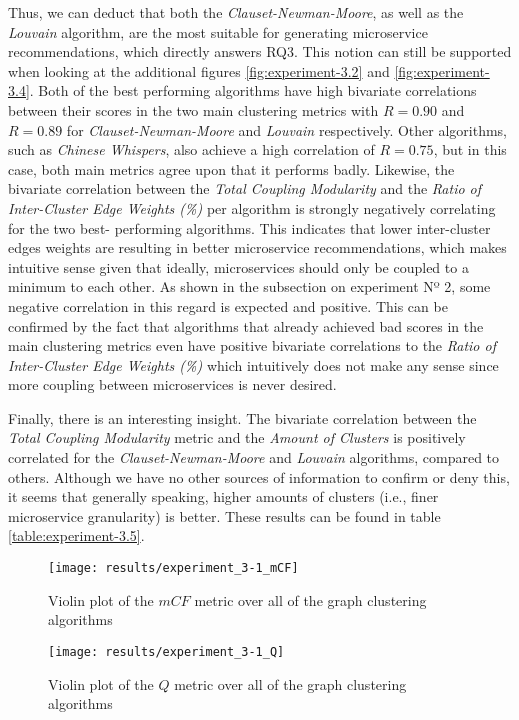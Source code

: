 \documentclass[12pt,a4paper]{report}
\begin{document}
Thus, we can deduct that both the \textit{Clauset-Newman-Moore}, as well as the
\textit{Louvain} algorithm, are the most suitable for generating microservice
recommendations, which directly answers RQ3. This notion can still be supported
when looking at the additional figures \ref{fig:experiment-3.2} and
\ref{fig:experiment-3.4}. Both of the best performing algorithms have high bivariate
correlations between their scores in the two main clustering metrics with \(R =
0.90\) and \(R = 0.89\) for \textit{Clauset-Newman-Moore} and \textit{Louvain}
respectively. Other algorithms, such as \textit{Chinese Whispers}, also achieve
a high correlation of \(R = 0.75\), but in this case, both main metrics agree
upon that it performs badly. Likewise, the bivariate correlation between the
\textit{Total Coupling Modularity} and the \textit{Ratio of Inter-Cluster Edge Weights (\%)}
per algorithm is strongly negatively correlating for the two best\hyp
performing algorithms. This indicates that lower inter-cluster edges weights
are resulting in better microservice recommendations, which makes intuitive
sense given that ideally, microservices should only be coupled to a minimum to
each other. As shown in the subsection on experiment Nº 2, some negative
correlation in this regard is expected and positive. This can be confirmed by
the fact that algorithms that already achieved bad scores in the main
clustering metrics even have positive bivariate correlations to the \textit{
Ratio of Inter-Cluster Edge Weights (\%)} which intuitively does not make any
sense since more coupling between microservices is never desired.

Finally, there is an interesting insight. The bivariate correlation between the
\textit{Total Coupling Modularity} metric and the \textit{Amount of Clusters}
is positively correlated for the \textit{Clauset-Newman-Moore} and \textit{
Louvain} algorithms, compared to others. Although we have no other sources of
information to confirm or deny this, it seems that generally speaking, higher
amounts of clusters (i.e., finer microservice granularity) is better. These
results can be found in table \ref{table:experiment-3.5}.

\begin{figure}[htbp]
\centering
\texttt{[image: results/experiment\_3-1\_mCF]}
\caption{Violin plot of the $mCF$ metric over all of the graph clustering algorithms}
\label{fig:experiment-3.1_mCF}
\end{figure}

\begin{figure}[htbp]
\centering
\texttt{[image: results/experiment\_3-1\_Q]}
\caption{Violin plot of the $Q$ metric over all of the graph clustering algorithms}
\label{fig:experiment-3.1_Q}
\end{figure}
\end{document}
